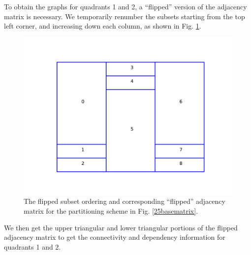 To obtain the graphs for quadrants 1 and 2, a ``flipped'' version of the adjacency matrix is necessary.
We temporarily renumber the subsets starting from the top left corner, and increasing down each column, as shown in Fig. \ref{25flippedmatrix}.
\begin{figure}[H]
\begin{minipage}[c]{0.5\textwidth}
\centering
\includegraphics[scale=0.7]{../../figures/boundaries_worst_flipped.pdf}
\end{minipage}
\begin{minipage}[c]{0.5\textwidth}
\centering
{}
\end{minipage}
\caption{The flipped subset ordering and corresponding ``flipped'' adjacency matrix for the partitioning scheme in Fig. \ref{25basematrix}.}
\label{25flippedmatrix}
\end{figure}
We then get the upper triangular and lower triangular portions of the flipped adjacency matrix to get the connectivity and dependency information for quadrants 1 and 2.
